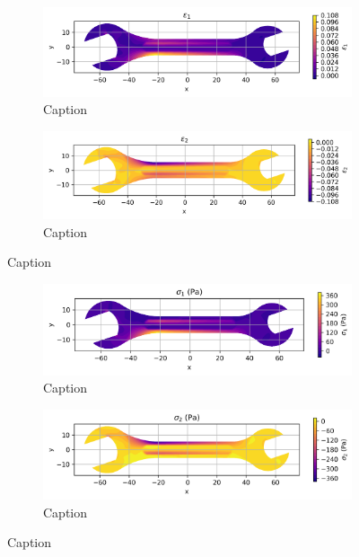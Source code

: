 \begin{figure}[H]
  \centering
  \begin{subfigure}[t]{0.49\textwidth}
    \centering
    \includegraphics[width=\textwidth]{GRAFICOS/Case b - epsilon_1.png}
    \caption{Caption}
    \label{fig:deformada_reacciones}
  \end{subfigure}
  \hfill
  \begin{subfigure}[t]{0.49\textwidth}
    \centering
    \includegraphics[width=\textwidth]{GRAFICOS/Case b - epsilon_2.png}
    \caption{Caption}
    \label{fig:von_mises}
  \end{subfigure}
  \caption{Caption}
  \label{fig:analisis_estructural}
\end{figure}

\begin{figure}[H]
  \centering
  \begin{subfigure}[t]{0.49\textwidth}
    \centering
    \includegraphics[width=\textwidth]{GRAFICOS/Case b - sigma_1.png}
    \caption{Caption}
    \label{fig:deformada_reacciones}
  \end{subfigure}
  \hfill
  \begin{subfigure}[t]{0.49\textwidth}
    \centering
    \includegraphics[width=\textwidth]{GRAFICOS/Case b - sigma_2.png}
    \caption{Caption}
    \label{fig:von_mises}
  \end{subfigure}
  \caption{Caption}
  \label{fig:analisis_estructural}
\end{figure}

